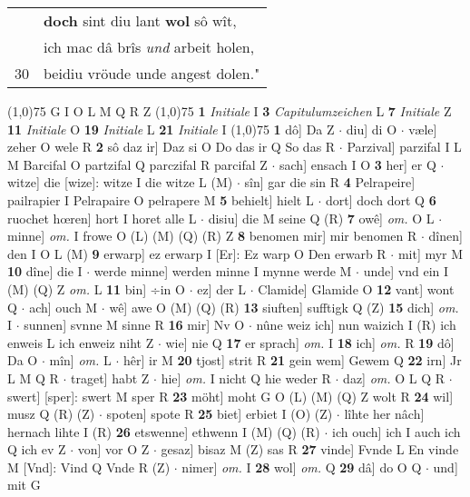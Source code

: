 \documentclass[8pt,a4paper,notitlepage]{article}
\begin{document}
\begin{table}[ht]
\begin{minipage}[t]{0.5\linewidth}
\begin{tabular}{rl}
 & \textbf{doch} sint diu lant \textbf{wol} sô wît,\\ 
 & ich mac dâ brîs \textit{und} arbeit holen,\\ 
30 & beidiu vröude unde angest dolen."\\ 
\end{tabular}
\scriptsize
\line(1,0){75} \newline
G I O L M Q R Z \newline
\line(1,0){75} \newline
\textbf{1} \textit{Initiale} I  \textbf{3} \textit{Capitulumzeichen} L  \textbf{7} \textit{Initiale} Z  \textbf{11} \textit{Initiale} O  \textbf{19} \textit{Initiale} L  \textbf{21} \textit{Initiale} I  \newline
\line(1,0){75} \newline
\textbf{1} dô] Da Z  $\cdot$ diu] di O  $\cdot$ væle] zeher O wele R \textbf{2} sô daz ir] Daz si O Do das ir Q So das R  $\cdot$ Parzival] parzifal I L M Barcifal O partzifal Q parczifal R parcifal Z  $\cdot$ sach] ensach I O \textbf{3} her] er Q  $\cdot$ witze] die [wize]: witze I die witze L (M)  $\cdot$ sîn] gar die sin R \textbf{4} Pelrapeire] pailrapier I Pelrapaire O pelrapere M \textbf{5} behielt] hielt L  $\cdot$ dort] doch dort Q \textbf{6} ruochet hœren] hort I horet alle L  $\cdot$ disiu] die M seine Q (R) \textbf{7} owê] \textit{om.} O L  $\cdot$ minne] \textit{om.} I frowe O (L) (M) (Q) (R) Z \textbf{8} benomen mir] mir benomen R  $\cdot$ dînen] den I O L (M) \textbf{9} erwarp] ez erwarp I [Er]: Ez warp O Den erwarb R  $\cdot$ mit] myr M \textbf{10} dîne] die I  $\cdot$ werde minne] werden minne I mynne werde M  $\cdot$ unde] vnd ein I (M) (Q) Z \textit{om.} L \textbf{11} bin] ÷in O  $\cdot$ ez] der L  $\cdot$ Clamide] Glamide O \textbf{12} vant] wont Q  $\cdot$ ach] ouch M  $\cdot$ wê] awe O (M) (Q) (R) \textbf{13} siuften] sufftigk Q (Z) \textbf{15} dich] \textit{om.} I  $\cdot$ sunnen] svnne M sinne R \textbf{16} mir] Nv O  $\cdot$ nûne weiz ich] nun waizich I (R) ich enweis L ich enweiz niht Z  $\cdot$ wie] nie Q \textbf{17} er sprach] \textit{om.} I \textbf{18} ich] \textit{om.} R \textbf{19} dô] Da O  $\cdot$ mîn] \textit{om.} L  $\cdot$ hêr] ir M \textbf{20} tjost] strit R \textbf{21} gein wem] Gewem Q \textbf{22} irn] Jr L M Q R  $\cdot$ traget] habt Z  $\cdot$ hie] \textit{om.} I nicht Q hie weder R  $\cdot$ daz] \textit{om.} O L Q R  $\cdot$ swert] [sper]: swert M sper R \textbf{23} möht] moht G O (L) (M) (Q) Z wolt R \textbf{24} wil] musz Q (R) (Z)  $\cdot$ spoten] spote R \textbf{25} biet] erbiet I (O) (Z)  $\cdot$ lîhte her nâch] hernach lihte I (R) \textbf{26} etswenne] ethwenn I (M) (Q) (R)  $\cdot$ ich ouch] ich I auch ich Q ich ev Z  $\cdot$ von] vor O Z  $\cdot$ gesaz] bisaz M (Z) sas R \textbf{27} vinde] Fvnde L En vinde M [Vnd]: Vind Q Vnde R (Z)  $\cdot$ nimer] \textit{om.} I \textbf{28} wol] \textit{om.} Q \textbf{29} dâ] do O Q  $\cdot$ und] mit G \newline

\end{minipage}
\end{table}
\end{document}
